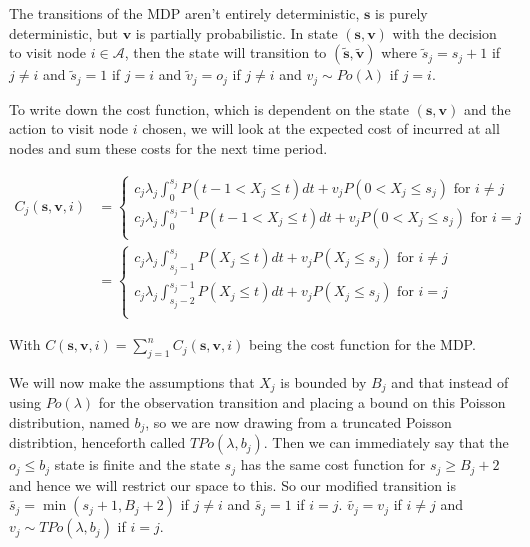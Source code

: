 \documentclass[a4paper,10pt]{article}
\theoremstyle{definition}
\theoremstyle{definition}
\theoremstyle{remark}
\theoremstyle{definition}
\begin{document}
The transitions of the MDP aren't entirely deterministic, $\bm{s}$ is purely deterministic, but $\bm{v}$ is partially probabilistic. In state $(\bm{s},\bm{v})$ with the decision to visit node $i \in \mathcal{A}$, then the state will transition to $(\widetilde{\bm{s}},\widetilde{\bm{v}})$ where $\widetilde{s}_{j}=s_{j}+1$ if $j \neq i$ and $\widetilde{s}_{j}=1$ if $j=i$ and $\widetilde{v}_{j}=o_{j}$ if $j \neq i$ and $v_{j} \sim Po(\lambda)$ if $j=i$.

To write down the cost function, which is dependent on the state $(\bm{s},\bm{v})$ and the action to visit node $i$ chosen, we will look at the expected cost of incurred at all nodes and sum these costs for the next time period.

\begin{align}
C_{j}(\bm{s},\bm{v},i)&= \begin{cases}
c_{j} \lambda_{j} \int_{0}^{s_{j}} P(t-1<X_{j} \leq t) dt +v_{j}P(0<X_{j} \leq s_{j})  \text{ for } i \neq j \\
c_{j} \lambda_{j} \int_{0}^{s_{j}-1} P(t-1<X_{j} \leq t) dt +v_{j}P(0<X_{j} \leq s_{j})  \text{ for } i=j \\
\end{cases}
 \nonumber \\
&= \begin{cases}
c_{j} \lambda_{j} \int_{s_{j}-1}^{s_{j}} P(X_{j} \leq t) dt +v_{j}P(X_{j} \leq s_{j}) \text{ for } i \neq j \\
c_{j} \lambda_{j} \int_{s_{j}-2}^{s_{j}-1} P(X_{j} \leq t) dt +v_{j}P(X_{j} \leq s_{j})   \text{ for } i=j \\
\end{cases} 
\end{align}
   
With $C(\bm{s},\bm{v},i)=\sum\limits_{j=1}^{n} C_{j}(\bm{s},\bm{v},i)$ being the cost function for the MDP.

We will now make the assumptions that $X_{j}$ is bounded by $B_{j}$ and that instead of using $Po(\lambda)$ for the observation transition and placing a bound on this Poisson distribution, named $b_{j}$, so we are now drawing from a truncated Poisson distribtion, henceforth called $TPo(\lambda,b_{j})$. Then we can immediately say that the $o_{j} \leq b_{j}$ state is finite and the state $s_{j}$ has the same cost function for $s_{j} \geq B_{j}+2$ and hence we will restrict our space to this. So our modified transition is $\widetilde{s_{j}}=\min(s_{j}+1,B_{j}+2)$ if $j \neq i$ and $\widetilde{s_{j}}=1$ if $i=j$. $\widetilde{v_{j}}=v_{j}$ if $i \neq j$ and $v_{j} \sim TPo(\lambda,b_{j})$ if $i=j$.
\end{document}
